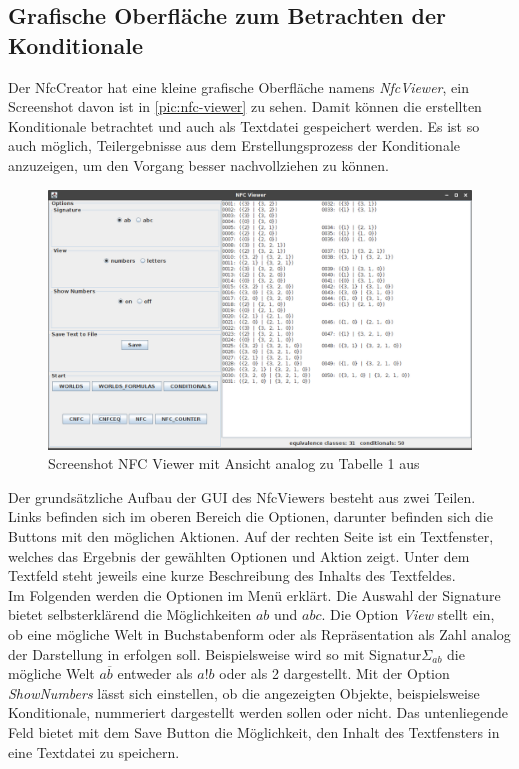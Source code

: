 \documentclass[12pt,a4paper]{article}
\begin{document}
\subsection{Grafische Oberfläche zum Betrachten der Konditionale}





Der NfcCreator hat eine kleine grafische Oberfläche namens \textit{NfcViewer}, ein Screenshot davon ist in \autoref{pic:nfc-viewer} zu sehen. Damit können die erstellten Konditionale betrachtet und auch als Textdatei gespeichert werden. Es ist so auch möglich, Teilergebnisse aus dem Erstellungsprozess der Konditionale anzuzeigen, um den Vorgang besser nachvollziehen zu können.


\begin{figure}
\includegraphics[width=0.9\linewidth]{bilder/NfcViewer.png}
\caption{Screenshot NFC Viewer mit Ansicht analog zu Tabelle 1 aus \cite{beierle19}}
\label{pic:nfc-viewer}
\end{figure}



Der grundsätzliche Aufbau der GUI des NfcViewers besteht aus zwei Teilen. Links befinden sich im oberen Bereich die Optionen, darunter befinden sich die Buttons mit den möglichen Aktionen. Auf der rechten Seite ist ein Textfenster, welches das Ergebnis der gewählten Optionen und Aktion zeigt. Unter dem Textfeld steht jeweils eine kurze Beschreibung des Inhalts des Textfeldes. \\
Im Folgenden werden die Optionen im Menü erklärt. Die Auswahl der Signature bietet selbsterklärend die Möglichkeiten $ab$ und $abc$. Die Option \textit{View} stellt ein, ob eine mögliche Welt in Buchstabenform oder als Repräsentation als Zahl analog der Darstellung in \cite{beierle19} erfolgen soll. Beispielsweise wird so mit Signatur$\Sigma_{ab}$ die mögliche Welt $a \overline{b}$ entweder als $a!b$ oder als 2 dargestellt. Mit der Option \textit{ShowNumbers} lässt sich einstellen, ob die angezeigten Objekte, beispielsweise Konditionale, nummeriert dargestellt werden sollen oder nicht. Das untenliegende Feld bietet mit dem Save Button die Möglichkeit, den Inhalt des Textfensters in eine Textdatei zu speichern.
\end{document}
